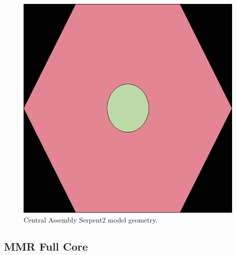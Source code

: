 \documentclass[11pt,letterpaper]{article}
\begin{document}
\begin{figure}[H]
	\centering
	\includegraphics[width=0.45\linewidth]{figures/central_block_geom1.png}
	\hfill
	\caption{Central Assembly Serpent2 model geometry.}
	\label{fig:CentralAssembly}
\end{figure}

\subsection{MMR Full Core}
\label{sub:Full}



\pagebreak


\end{document}
